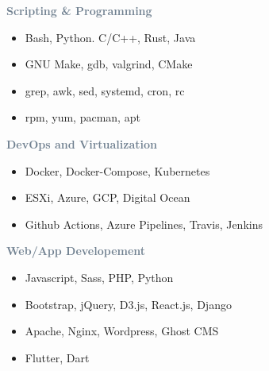 \documentclass[10pt,a4paper,ragged2e,withhyper]{altacv}
\begin{document}
\begin{paracol}{2}


\divider


\divider


\switchcolumn


\textcolor{SlateGrey}{\textbf{Scripting \& Programming}}
\newline
\begin{itemize}
    \item Bash, Python. C/C++, Rust, Java
    \item GNU Make, gdb, valgrind, CMake
    \item grep, awk, sed, systemd, cron, rc
    \item rpm, yum, pacman, apt 
\end{itemize}

\textcolor{SlateGrey}{\textbf{DevOps and Virtualization}}
\newline

\begin{itemize}
    \item Docker, Docker-Compose, Kubernetes
    \item ESXi, Azure, GCP, Digital Ocean
    \item Github Actions, Azure Pipelines, Travis, Jenkins
\end{itemize}

\textcolor{SlateGrey}{\textbf{Web/App Developement}}
\newline
\begin{itemize}
    \item Javascript, Sass, PHP, Python
    \item Bootstrap, jQuery, D3.js, React.js, Django
    \item Apache, Nginx, Wordpress, Ghost CMS
    \item Flutter, Dart
\end{itemize}


\end{paracol}
\end{document}
